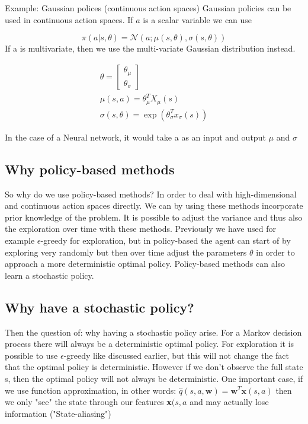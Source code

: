 \begin{example}{Example: Gaussian polices (continuous action spaces)}
Gaussian policies can be used in continuous action spaces. If $a$ is a scalar variable we can use 

	\begin{equation}
		\pi (a|s,\theta) = \mathcal{N}(a; \mu(s,\theta),\sigma(s,\theta))
	\end{equation}
If a is multivariate, then we use the multi-variate Gaussian distribution instead.

	\begin{equation}
	\begin{aligned}
		\theta = \begin{bmatrix} \theta_\mu \\ \theta_\sigma \end{bmatrix} \\ \mu(s,a) = \theta_\mu^{T} X_\mu(s) \\ \sigma(s,\theta) = \exp(\theta_\sigma^{T}x_\sigma(s))
	\end{aligned}
	\end{equation}

In the case of a Neural network, it would take a as an input and output $\mu$ and $\sigma$

\end{example}	


\subsection*{Why policy-based methods}
So why do we use policy-based methods? In order to deal with high-dimensional and continuous action spaces directly. We can by using these methods incorporate prior knowledge of the problem. It is possible to adjust the variance and thus also the exploration over time with these methods. Previously we have used for example $\epsilon$-greedy for exploration, but in policy-based the agent can start of by exploring very randomly but then over time adjust the parameters $\theta$ in order to approach a more deterministic optimal policy. Policy-based methods can also learn a stochastic policy. 

\subsection*{Why have a stochastic policy?}
Then the question of: why having a stochastic policy arise. For a Markov decision process there will always be a deterministic optimal policy. For exploration it is possible to use $\epsilon$-greedy like discussed earlier, but this will not change the fact that the optimal policy is deterministic. However if we don't observe the full state s, then the optimal policy will not always be deterministic. One important case, if we use function approximation, in other words: $\hat{q}(s,a,\textbf{w}) = \textbf{w}^{T}\textbf{x}(s,a)$ then we only "see" the state through our features \textbf{x}$(s,a$ and may actually lose information ("State-aliasing")


